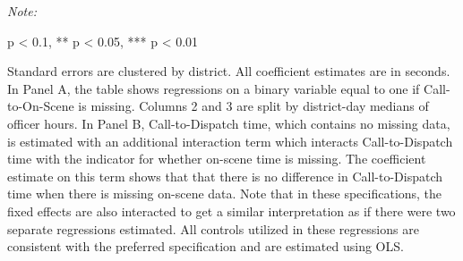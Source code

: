\begin{table}[H]
\begin{threeparttable}
\begin{tablenotes}
\item \textit{Note: } 
\item * p < 0.1, ** p < 0.05, *** p < 0.01
\item Standard errors are clustered by district. All coefficient                      estimates are in seconds. In Panel A,                      the table shows regressions on a binary variable equal to                      one if Call-to-On-Scene is missing. Columns 2 and 3 are split by                      district-day medians of officer hours. In Panel B, Call-to-Dispatch                      time, which contains no missing data, is estimated with an additional interaction term                      which interacts Call-to-Dispatch time with the indicator for whether                      on-scene time is missing. The coefficient estimate on this term shows that                      that there is no difference in Call-to-Dispatch time when there is                       missing on-scene data. Note that in these specifications, the fixed effects                      are also interacted to get a similar interpretation as if there were two separate                      regressions estimated. All controls utilized in these regressions                      are consistent with the preferred specification and are estimated                      using OLS.                  
\end{tablenotes}
\end{threeparttable}
\end{table}
